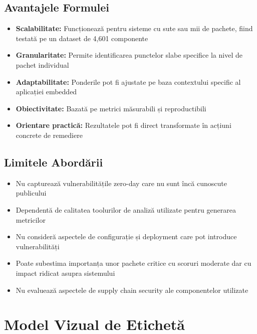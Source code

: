 \documentclass[12pt,a4paper]{article}
\begin{document}
\subsection{Avantajele Formulei}

\begin{itemize}
\item \textbf{Scalabilitate:} Funcționează pentru sisteme cu sute sau mii de pachete, fiind testată pe un dataset de 4,601 componente
\item \textbf{Granularitate:} Permite identificarea punctelor slabe specifice la nivel de pachet individual
\item \textbf{Adaptabilitate:} Ponderile pot fi ajustate pe baza contextului specific al aplicației embedded
\item \textbf{Obiectivitate:} Bazată pe metrici măsurabili și reproductibili
\item \textbf{Orientare practică:} Rezultatele pot fi direct transformate în acțiuni concrete de remediere
\end{itemize}

\subsection{Limitele Abordării}

\begin{itemize}
\item Nu capturează vulnerabilitățile zero-day care nu sunt încă cunoscute publicului
\item Dependentă de calitatea toolurilor de analiză utilizate pentru generarea metricilor
\item Nu consideră aspectele de configurație și deployment care pot introduce vulnerabilități
\item Poate subestima importanța unor pachete critice cu scoruri moderate dar cu impact ridicat asupra sistemului
\item Nu evaluează aspectele de supply chain security ale componentelor utilizate
\end{itemize}

\section{Model Vizual de Etichetă}
\end{document}
